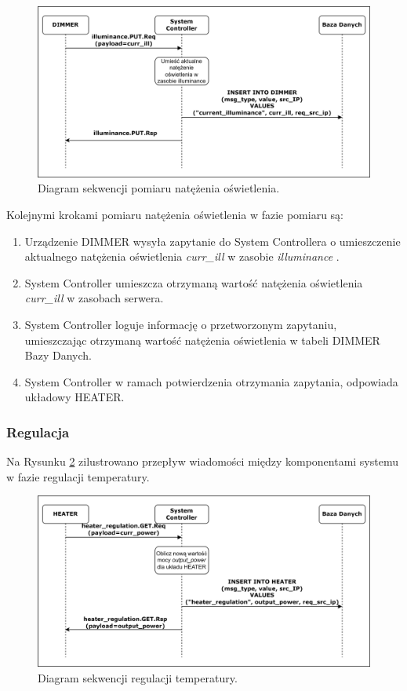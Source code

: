             \begin{figure}[H]
                \centering
                \includegraphics[width=0.8\linewidth]{graphics/sequence-diagrams/dimmer-measure-seq.png}
                \caption{Diagram sekwencji pomiaru natężenia oświetlenia.}
                \label{fig:seq-dimmer-measure}
            \end{figure}

            Kolejnymi krokami pomiaru natężenia oświetlenia w fazie pomiaru są:
            \begin{enumerate}
                \item Urządzenie DIMMER wysyła zapytanie do System Controllera o umieszczenie aktualnego natężenia oświetlenia \textit{curr\_ill} w zasobie \textit{illuminance} .
                \item System Controller umieszcza otrzymaną wartość natężenia oświetlenia \textit{curr\_ill} w zasobach serwera.
                \item System Controller loguje informację o przetworzonym zapytaniu, umieszczając otrzymaną wartość natężenia oświetlenia w tabeli DIMMER Bazy Danych.
                \item System Controller w ramach potwierdzenia otrzymania zapytania, odpowiada układowy HEATER.
            \end{enumerate}


        \subsubsection{Regulacja}

            Na Rysunku \ref{fig:seq-heater-regulate} zilustrowano przepływ wiadomości między komponentami systemu w fazie regulacji temperatury.

            \begin{figure}[H]
                \centering
                \includegraphics[width=0.8\linewidth]{graphics/sequence-diagrams/heater-regulate-seq.png}
                \caption{Diagram sekwencji regulacji temperatury.}
                \label{fig:seq-heater-regulate}
            \end{figure}

